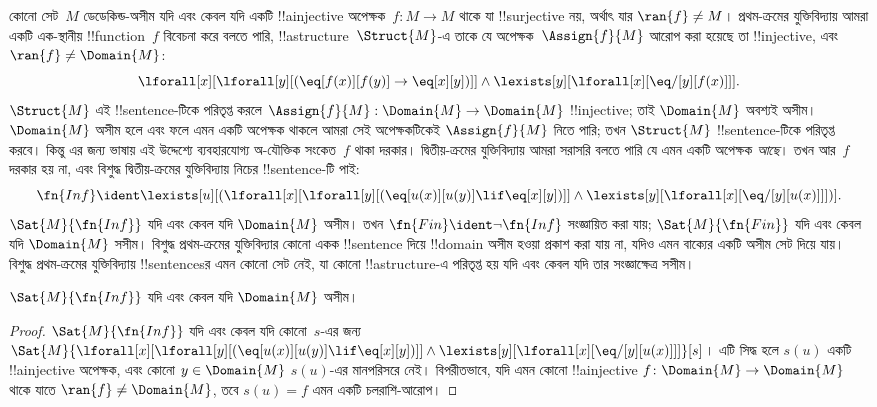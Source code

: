 \documentclass[../../../include/open-logic-section]{subfiles}
\begin{document}


কোনো সেট~$M$ ডেডেকিন্ড-অসীম যদি এবং কেবল যদি একটি !!a{injective}
অপেক্ষক~$f\colon M \to M$ থাকে যা !!{surjective} নয়, অর্থাৎ যার
$\ran{f} \neq M$। প্রথম-ক্রমের যুক্তিবিদ্যায় আমরা একটি এক-স্থানীয়
!!{function}~$f$ বিবেচনা করে বলতে পারি, !!a{structure}~$\Struct{M}$-এ
তাকে যে অপেক্ষক~$\Assign{f}{M}$ আরোপ করা হয়েছে তা !!{injective}, এবং
$\ran{f} \neq \Domain{M}$:
\[
\lforall[x][\lforall[y][(\eq[f(x)][f(y)] \to \eq[x][y])]] \land
\lexists[y][\lforall[x][\eq/[y][f(x)]]].
\]
$\Struct{M}$ এই !!{sentence}-টিকে পরিতৃপ্ত করলে $\Assign{f}{M}:
\Domain{M} \to \Domain{M}$ !!{injective}; তাই $\Domain{M}$ অবশ্যই
অসীম। $\Domain{M}$ অসীম হলে এবং ফলে এমন একটি অপেক্ষক থাকলে আমরা সেই
অপেক্ষকটিকেই $\Assign{f}{M}$ নিতে পারি; তখন $\Struct{M}$
!!{sentence}-টিকে পরিতৃপ্ত করবে। কিন্তু এর জন্য ভাষায় এই উদ্দেশ্যে
ব্যবহারযোগ্য অ-যৌক্তিক সংকেত~$f$ থাকা দরকার। দ্বিতীয়-ক্রমের
যুক্তিবিদ্যায় আমরা সরাসরি বলতে পারি যে এমন একটি অপেক্ষক
\emph{আছে}। তখন আর~$f$ দরকার হয় না, এবং বিশুদ্ধ দ্বিতীয়-ক্রমের
যুক্তিবিদ্যায় নিচের !!{sentence}-টি পাই:
\[
\fn{Inf} \ident \lexists[u][(\lforall[x][\lforall[y][(\eq[u(x)][u(y)]
      \lif \eq[x][y])]] \land \lexists[y][\lforall[x][\eq/[y][u(x)]]])].
\]
$\Sat{M}{\fn{Inf}}$ যদি এবং কেবল যদি $\Domain{M}$ অসীম। তখন
$\fn{Fin} \ident \lnot \fn{Inf}$ সংজ্ঞায়িত করা যায়;
$\Sat{M}{\fn{Fin}}$ যদি এবং কেবল যদি $\Domain{M}$ সসীম। বিশুদ্ধ
প্রথম-ক্রমের যুক্তিবিদ্যার কোনো একক !!{sentence} দিয়ে !!{domain} অসীম
হওয়া প্রকাশ করা যায় না, যদিও এমন বাক্যের একটি অসীম সেট দিয়ে যায়।
বিশুদ্ধ প্রথম-ক্রমের যুক্তিবিদ্যায় !!{sentence}sর এমন কোনো সেট নেই,
যা কোনো !!a{structure}-এ পরিতৃপ্ত হয় যদি এবং কেবল যদি তার
সংজ্ঞাক্ষেত্র সসীম।

\begin{prop}
$\Sat{M}{\fn{Inf}}$ যদি এবং কেবল যদি $\Domain{M}$ অসীম।
\end{prop}

\begin{proof}
$\Sat{M}{\fn{Inf}}$ যদি এবং কেবল যদি কোনো~$s$-এর জন্য
  $\Sat{M}{\lforall[x][\lforall[y][(\eq[u(x)][u(y)] \lif \eq[x][y])]]
    \land \lexists[y][\lforall[x][\eq/[y][u(x)]]]}[s]$। এটি সিদ্ধ
  হলে $s(u)$ একটি !!a{injective} অপেক্ষক, এবং কোনো $y \in \Domain{M}$
  $s(u)$-এর মানপরিসরে নেই। বিপরীতভাবে, যদি এমন কোনো !!a{injective}
  $f\colon \Domain{M} \to \Domain{M}$ থাকে যাতে $\ran{f} \neq
  \Domain{M}$, তবে $s(u) = f$ এমন একটি চলরাশি-আরোপ।
\end{proof}
\end{document}
